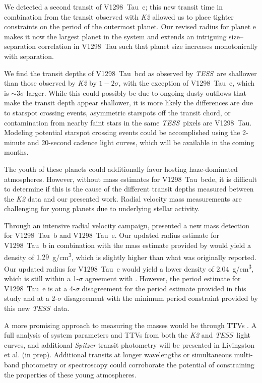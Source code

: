 \documentclass[twocolumn]{aastex631}
\newcommand{\tess}{\textit{TESS}}
\newcommand{\sname}{V1298~Tau\xspace}
\newcommand{\allplanets}{V1298~Tau~bcde\xspace}
\newcommand{\planetb}{V1298~Tau~b\xspace}
\newcommand{\planete}{V1298~Tau~e\xspace}
\newcommand{\planetknown}{V1298~Tau~bcd\xspace}
\begin{document}
We detected a second transit of \planete; this new transit time in combination from the transit observed with \textit{K2} allowed us to place tighter constraints on the period of the outermost planet. Our revised radius for planet e makes it now the largest planet in the system and extends an intriguing size--separation correlation in \sname such that planet size increases monotonically with separation.

We find the transit depths of \planetknown as observed by \tess\ are shallower than those observed by \textit{K2} by $1-2\sigma$, with the exception of \planete, which is $\sim 3\sigma$ larger. While this could possibly be due to ongoing dusty outflows that make the transit depth appear shallower, it is more likely the differences are due to starspot crossing events, asymmetric starspots off the transit chord, or contamination from nearby faint stars in the same \tess\ pixels are \sname. Modeling potential starspot crossing events could be accomplished using the 2-minute and 20-second cadence light curves, which will be available in the coming months.

The youth of these planets could additionally favor hosting haze-dominated atmospheres. However, without mass estimates for \allplanets, it is difficult to determine if this is the cause of the different transit depths measured between the \textit{K2} data and our presented work. Radial velocity mass measurements are challenging for young planets due to underlying stellar activity.

Through an intensive radial velocity campaign, \cite{suarez21} presented a new mass detection for \planetb and \planete. Our updated radius estimate for \planetb in combination with the mass estimate provided by \cite{suarez21} would yield a density of $1.29$~g/cm\textsuperscript{3}, which is slightly higher than what was originally reported. Our updated radius for \planete would yield a lower density of $2.04$~g/cm\textsuperscript{3}, which is still within a 1-$\sigma$ agreement with \cite{suarez21}. However, the period estimate for \planete is at a 4-$\sigma$ disagreement for the period estimate provided in this study and at a 2-$\sigma$ disagreement with the minimum period constraint provided by this new \tess\ data.

A more promising approach to measuring the masses would be through TTVs \citep{agol18}. A full analysis of system parameters and TTVs from both the \textit{K2} and \tess\ light curves, and additional \textit{Spitzer} transit photometry will be presented in Livingston et al. (in prep). Additional transits at longer wavelengths or simultaneous multi-band photometry or spectroscopy could corroborate the potential of constraining the properties of these young atmospheres.
\end{document}
